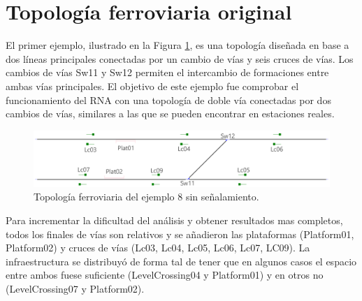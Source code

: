 \section{Topología ferroviaria original}

	El primer ejemplo, ilustrado en la Figura \ref{fig:EJ8_1}, es una topología diseñada en base a dos líneas principales conectadas por un cambio de vías y seis cruces de vías. Los cambios de vías Sw11 y Sw12 permiten el intercambio de formaciones entre ambas vías principales. El objetivo de este ejemplo fue comprobar el funcionamiento del RNA con una topología de doble vía conectadas por dos cambios de vías, similares a las que se pueden encontrar en estaciones reales.
	
	\begin{figure}[h]
		\centering
		\includegraphics[width=1\textwidth]{resultados-obtenidos/ejemplo8/images/8_empty.png}
		\centering\caption{Topología ferroviaria del ejemplo 8 sin señalamiento.}
		\label{fig:EJ8_1}
	\end{figure}
	
	Para incrementar la dificultad del análisis y obtener resultados mas completos, todos los finales de vías son relativos y se añadieron las plataformas (Platform01, Platform02) y cruces de vías (Lc03, Lc04, Lc05, Lc06, Lc07, LC09). La infraestructura se distribuyó de forma tal de tener que en algunos casos el espacio entre ambos fuese suficiente (LevelCrossing04 y Platform01) y en otros no (LevelCrossing07 y Platform02).
